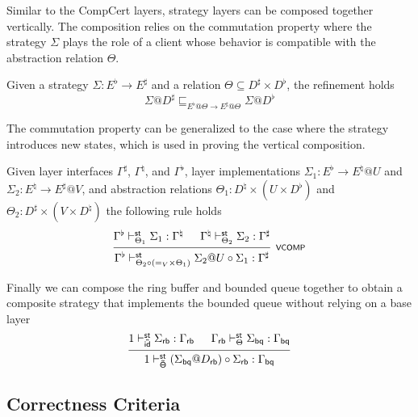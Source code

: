 \documentclass[acmsmall,review,anonymous]{acmart}\settopmatter{printfolios=true,printccs=false,printacmref=false}
\begin{document}
Similar to the CompCert layers,
strategy layers
can be composed together vertically.
The composition relies on
the commutation property
where the strategy $\Sigma$
plays the role of a client whose behavior
is compatible with the abstraction relation $\Theta$.
\begin{lemma}
  Given a strategy
  $\Sigma: E^\flat \rightarrow E^\sharp$
  and a relation
  $\Theta \subseteq D^\sharp \times D^\flat$,
  the refinement holds
  \[
    \Sigma@D^\sharp
    \sqsubseteq_{E^\flat@\Theta \rightarrow E^\sharp@\Theta}
    \Sigma@D^\flat
  \]
\end{lemma}
The commutation property
can be generalized to the case
where the strategy introduces new states,
which is used in proving the vertical composition.
\begin{theorem}
  Given layer interfaces
  $\Gamma^\sharp$, $\Gamma^\natural$, and $\Gamma^\flat$,
  layer implementations
  $\Sigma_1: E^\flat \rightarrow E^\natural @ U$
  and $\Sigma_2: E^\natural \rightarrow E^\sharp @ V$,
  and abstraction relations
  $\Theta_1: D^\natural \times (U \times D^\flat)$
  and $\Theta_2: D^\sharp \times (V \times D^\natural)$
  the following rule holds
  \[
    \begin{prooftree}
      \hypo{\Gamma^\flat \vdash^\kw{st}_{\Theta_1} \Sigma_1 : \Gamma^\natural}
      \hypo{\Gamma^\natural \vdash^\kw{st}_{\Theta_2} \Sigma_2 : \Gamma^\sharp}
      \infer2[\scriptsize\kw{VCOMP}]{\Gamma^\flat
        \vdash^\kw{st}_{\Theta_2 \circ (=_V \times \Theta_1)}
        \Sigma_2@U \circ \Sigma_1 : \Gamma^\sharp}
    \end{prooftree}
  \]
\end{theorem}

Finally we can compose
the ring buffer and bounded queue together
to obtain a composite strategy
that implements the bounded queue
without relying on a base layer
\[
  \begin{prooftree}
    \hypo{1 \vdash^\kw{st}_\kw{\tilde{id}} \Sigma_\kw{rb} : \Gamma_\kw{rb}}
    \hypo{\Gamma_\kw{rb} \vdash^\kw{st}_\Theta \Sigma_\kw{bq} : \Gamma_\kw{bq}}
    \infer2{1 \vdash^\kw{st}_\kw{\tilde{\Theta}}
      (\Sigma_\kw{bq}@D_\kw{rb}) \circ \Sigma_\kw{rb}: \Gamma_\kw{bq}}
  \end{prooftree}
\]


\subsection{Correctness Criteria} %
\label{sec:stcal:cc}
\end{document}
